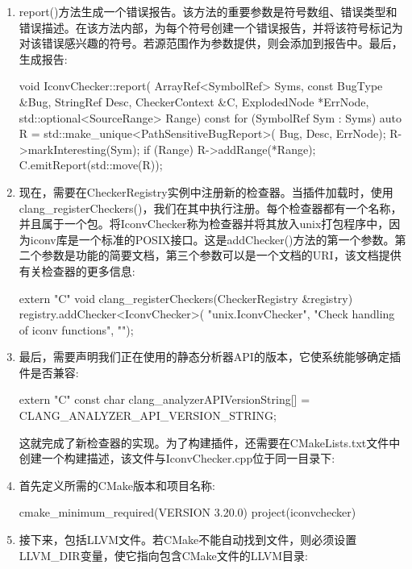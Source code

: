 \begin{enumerate}
\item
report()方法生成一个错误报告。该方法的重要参数是符号数组、错误类型和错误描述。在该方法内部，为每个符号创建一个错误报告，并将该符号标记为对该错误感兴趣的符号。若源范围作为参数提供，则会添加到报告中。最后，生成报告:

\begin{cpp}
void IconvChecker::report(
        ArrayRef<SymbolRef> Syms, const BugType &Bug,
        StringRef Desc, CheckerContext &C,
        ExplodedNode *ErrNode,
        std::optional<SourceRange> Range) const {
    for (SymbolRef Sym : Syms) {
        auto R = std::make_unique<PathSensitiveBugReport>(
            Bug, Desc, ErrNode);
        R->markInteresting(Sym);
        if (Range)
            R->addRange(*Range);
        C.emitReport(std::move(R));
    }
}
\end{cpp}

\item
现在，需要在CheckerRegistry实例中注册新的检查器。当插件加载时，使用clang\_registerCheckers()，我们在其中执行注册。每个检查器都有一个名称，并且属于一个包。将IconvChecker称为检查器并将其放入unix打包程序中，因为iconv库是一个标准的POSIX接口。这是addChecker()方法的第一个参数。第二个参数是功能的简要文档，第三个参数可以是一个文档的URI，该文档提供有关检查器的更多信息:

\begin{cpp}
extern "C" void
clang_registerCheckers(CheckerRegistry &registry) {
    registry.addChecker<IconvChecker>(
        "unix.IconvChecker",
        "Check handling of iconv functions", "");
}
\end{cpp}

\item
最后，需要声明我们正在使用的静态分析器API的版本，它使系统能够确定插件是否兼容:

\begin{cpp}
extern "C" const char clang_analyzerAPIVersionString[] =
    CLANG_ANALYZER_API_VERSION_STRING;
\end{cpp}

这就完成了新检查器的实现。为了构建插件，还需要在CMakeLists.txt文件中创建一个构建描述，该文件与IconvChecker.cpp位于同一目录下:

\item
首先定义所需的CMake版本和项目名称:

\begin{cmake}
cmake_minimum_required(VERSION 3.20.0)
project(iconvchecker)
\end{cmake}

\item
接下来，包括LLVM文件。若CMake不能自动找到文件，则必须设置LLVM\_DIR变量，使它指向包含CMake文件的LLVM目录:


\end{enumerate}
